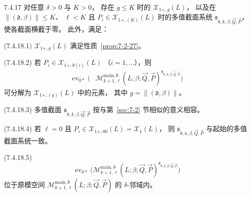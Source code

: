 \begin{lemma}{7.4.17}\label{lem:7-4-17}
对任意 \(\delta>0\) 与 \(K>0\)，
存在 \(g\le K\) 时的
\(\mathcal X_{1+,g}(L)\)，
以及在
\(\|(\mathfrak d,\beta)\|\le K\)、
\(\ell<K\) 且
\(P_i\in\mathcal X_{1+,(K)}(L)\)
时的多值截面系统
\(\mathfrak s_{\mathfrak d,k,\beta,
\vec Q,\vec P}\)，
使各截面横截于零。
此外，满足：

\par\noindent\textup{(7.4.18.1)}\label{cond:7-4-18-1}\quad
\(\mathcal X_{1+,g}(L)\)
满足性质~\ref{prop:7-2-27}。

\par\noindent\textup{(7.4.18.2)}\label{cond:7-4-18-2}\quad
若
\(P_i\in\mathcal X_{1+,\mathfrak d(i)}(L)\)
（\(i=1,\ldots\)），则
\[
\begin{aligned}
\operatorname{ev}_{0*}\bigl(
&\mathcal M^{\mathrm{main},\mathfrak d}_{k+1,\ell}
(L;\beta;\vec Q,\vec P)^{\mathfrak s_{
\mathfrak d,k,\beta,\vec Q,\vec P}}\bigr)
\end{aligned}
\]
可分解为
\(\mathcal X_{1+,(g)}(L)\) 中的元素，
其中
\(g=\|(\mathfrak d,\beta)\|\)。

\par\noindent\textup{(7.4.18.3)}\label{cond:7-4-18-3}\quad
多值截面
\(\mathfrak s_{\mathfrak d,k,\beta,
\vec Q,\vec P}\)
按与第~\ref{sec:7-2} 节相似的意义相容。

\par\noindent\textup{(7.4.18.4)}\label{cond:7-4-18-4}\quad
若 \(\ell=0\) 且
\(P_i\in\mathcal X_{1+,00}(L)
=\mathcal X_1(L)\)，
则
\(\mathfrak s_{\mathfrak d,k,\beta,
\vec Q,\vec P}\)
与起始的多值截面系统一致。

\par\noindent\textup{(7.4.18.5)}\label{cond:7-4-18-5}\quad
\[
\operatorname{ev}_{0*}\bigl(
\mathcal M^{\mathrm{main},\mathfrak d}_{k+1,\ell}
(L;\beta;\vec Q,\vec P)^{\mathfrak s_{
\mathfrak d,k,\beta,\vec Q,\vec P}}\bigr)
\]
位于原模空间
\(
\mathcal M^{\mathrm{main},\mathfrak d}_{k+1,\ell}
(L;\beta;\vec Q,\vec P)
\)
的 \(\delta\)-邻域内。
\end{lemma}

